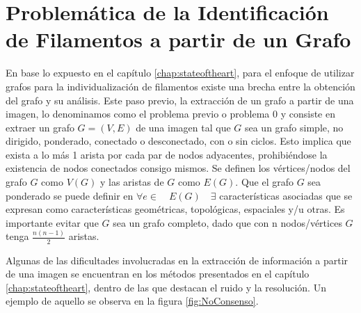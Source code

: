 \chapter{Problem\'atica de la Identificaci\'on de Filamentos a partir de un Grafo}
\label{chap:cap2}


En base lo expuesto en el cap\'itulo \ref{chap:stateoftheart}, para el enfoque de utilizar grafos para la individualizaci\'on de filamentos existe una brecha entre la obtenci\'on del grafo y su an\'alisis. Este paso previo, la extracci\'on de un grafo a partir de una imagen, lo denominamos como el problema previo o problema 0 y consiste en extraer un grafo $G = (V,E)$ de una imagen tal que $G$ sea un grafo simple, no dirigido, ponderado, conectado o desconectado, con o sin ciclos. Esto implica que exista a lo m\'as 1 arista por cada par de nodos adyacentes, prohibi\'endose la existencia de nodos conectados consigo mismos. Se definen los v\'ertices/nodos del grafo $G$ como $V(G)$ y las aristas de $G$ como $E(G)$. 
Que el grafo $G$ sea ponderado se puede definir en $\forall e \in \quad E(G) \quad  \exists $ caracter\'isticas asociadas que se expresan como caracter\'isticas geom\'etricas, topol\'ogicas, espaciales y/u otras. Es importante evitar que $G$ sea un grafo completo, dado que con n nodos/v\'ertices $G$ tenga $\frac{n(n-1)}{2}$ aristas. 

Algunas de las dificultades involucradas en la extracci\'on de informaci\'on a partir de una imagen se encuentran en los m\'etodos presentados en el cap\'itulo \ref{chap:stateoftheart}, dentro de las que destacan el ruido y la resoluci\'on. Un ejemplo de aquello se observa en la figura \ref{fig:NoConsenso}.

